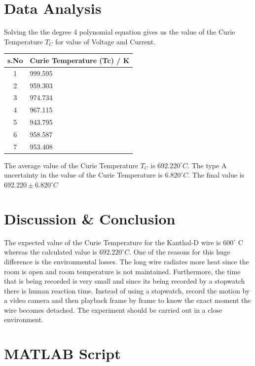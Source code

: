 \section{Data Analysis}

Solving the the degree 4 polynomial equation gives us the value of the Curie Temperature $T_C$ for value of Voltage and Current.  
\begin{center}
\begin{tabular}{|c|l|}
\hline
\textbf{s.No} & Curie Temperature (Tc) / K \\ \hline
1             & 999.595                     \\ \hline
2             & 959.303                     \\ \hline
3             & 974.734                     \\ \hline
4             & 967.115                     \\ \hline
5             & 943.795                     \\ \hline
6             & 958.587                     \\ \hline
7             & 953.408                     \\ \hline
\end{tabular}
\end{center}
The average value of the Curie Temperature $T_C$ is $692.220^\circ C$. The type A uncertainty in the value of the Curie Temperature is $6.820^\circ C$. The final value is $ 692.220 \pm 6.820 ^\circ C$

\section{Discussion \& Conclusion}

The expected value of the Curie Temperature for the Kanthal-D wire is $600 ^\circ $ C whereas the calculated value is $692.220^\circ C$. One of the reasons for this huge difference is the environmental losses. The long wire radiates more heat since the room is open and room temperature is not maintained. Furthermore, the time that is being recorded is very small and since its being recorded by a stopwatch there is human reaction time. Instead of using a stopwatch, record the motion by a video camera and then playback frame by frame to know the exact moment the wire becomes detached. The experiment should be carried out in a close environment. 



\section{MATLAB Script}




